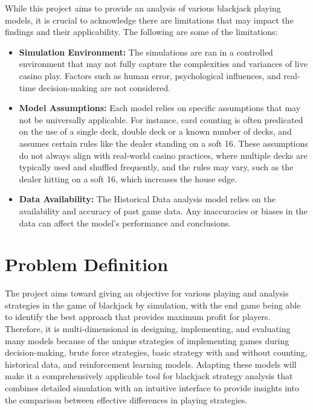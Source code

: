 \documentclass[a4paper,12pt]{report}
\begin{document}
While this project aims to provide an analysis of various blackjack playing models, it is crucial to acknowledge there are limitations that may impact the findings and their applicability. The following are some of the limitations: 

\begin{itemize}
\item \textbf{Simulation Environment:} The simulations are ran in a controlled environment that may not fully capture the complexities and variances of live casino play. Factors such as human error, psychological influences, and real-time decision-making are not considered.

\item \textbf{Model Assumptions:} Each model relies on specific assumptions that may not be universally applicable. For instance, card counting is often predicated on the use of a single deck, double deck or a known number of decks, and assumes certain rules like the dealer standing on a soft 16. These assumptions do not always align with real-world casino practices, where multiple decks are typically used and shuffled frequently, and the rules may vary, such as the dealer hitting on a soft 16, which increases the house edge.

\item \textbf{Data Availability:} The Historical Data analysis model relies on the availability and accuracy of past game data. Any inaccuracies or biases in the data can affect the model’s performance and conclusions.
\end{itemize} 

\section{Problem Definition}
The project aims toward giving an objective for various playing and analysis strategies in the game of blackjack by simulation, with the end game being able to identify the best approach that provides maximum profit for players. Therefore, it is multi-dimensional in designing, implementing, and evaluating many models because of the unique strategies of implementing games during decision-making, brute force strategies, basic strategy with and without counting, historical data, and reinforcement learning models. Adapting these models will make it a comprehensively applicable tool for blackjack strategy analysis that combines detailed simulation with an intuitive interface to provide insights into the comparison between effective differences in playing strategies.
\end{document}
